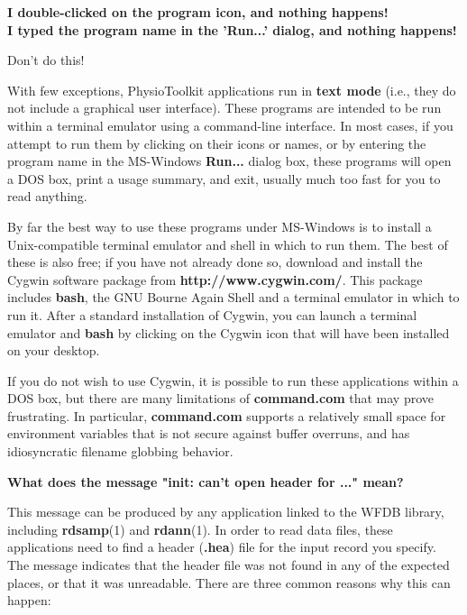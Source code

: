 \documentclass[twoside]{book}
\begin{document}
\noindent
{\large
\textbf{I double-clicked on the program icon, and nothing happens!}\\
\textbf{I typed the program name in the 'Run...' dialog, and nothing happens!}}

\noindent
Don't do this!

With few exceptions, PhysioToolkit applications run in \textbf{text mode}
(i.e., they do not include a graphical user interface).  These programs are
intended to be run within a terminal emulator using a command-line interface.
In most cases, if you attempt to run them by clicking on their icons or names,
or by entering the program name in the MS-Windows \textbf{Run...} dialog box,
these programs will open a DOS box, print a usage summary, and exit, usually
much too fast for you to read anything.

By far the best way to use these programs under MS-Windows is to install a
Unix-compatible terminal emulator and shell in which to run them.  The best of
these is also free; if you have not already done so, download and install the
Cygwin software package from \textbf{http://www.cygwin.com/}.  This package
includes \textbf{bash}, the GNU Bourne Again Shell and a terminal emulator in
which to run it.  After a standard installation of Cygwin, you can launch a
terminal emulator and \textbf{bash} by clicking on the Cygwin icon that will
have been installed on your desktop.

If you do not wish to use Cygwin, it is possible to run these applications
within a DOS box, but there are many limitations of \textbf{command.com} that
may prove frustrating.  In particular, \textbf{command.com} supports a
relatively small space for environment variables that is not secure against
buffer overruns, and has idiosyncratic filename globbing behavior.

\vspace{5mm}
\noindent
{\large \textbf{What does the message "init: can't open header for ..." mean?}}

\noindent
This message can be produced by any application linked to the WFDB
library, including \textbf{rdsamp}(1) and \textbf{rdann}(1).  In order to
read data files, these applications need to find a header (\textbf{.hea})
file for the input record you specify.  The message indicates that the header
file was not found in any of the expected places, or that it was
unreadable.  There are three common reasons why this can happen:
\end{document}
